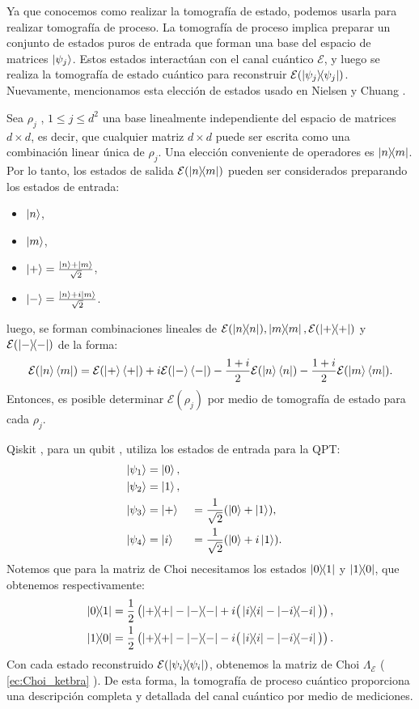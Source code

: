 \documentclass[letterpaper,12pt]{thesisECFM}
\theoremstyle{plain}
\theoremstyle{definition}
\theoremstyle{definition}
\theoremstyle{remark}
\newcommand{\1}{\mathbb{1}}
\begin{document}
Ya que conocemos como realizar la tomografía de estado, podemos usarla para realizar tomografía de proceso. La tomografía de proceso implica preparar un conjunto de estados puros de entrada que forman una base del espacio de matrices $\ket{\psi_j}$. Estos estados interactúan con el canal cuántico $\mathcal{E}$, y luego se realiza la tomografía de estado cuántico para reconstruir $\mathcal{E}(\ketbra{\psi_j}{\psi_j})$. Nuevamente, mencionamos esta elección de estados usado en Nielsen y Chuang \cite{nielsen_chuang_2011}. 

Sea $\rho_j$ , $1\leq j \leq d^2$ una base linealmente independiente del espacio de matrices $d\times d$, es decir, que cualquier matriz $d \times d$ puede ser escrita como una combinación linear única de $\rho_j$.  Una elección conveniente de operadores es $\ketbra{n}{m}$. Por lo tanto, los estados de salida $\mathcal{E}(\ketbra{n}{m})$ pueden ser considerados preparando los estados de entrada:
\begin{itemize}
    \item$\ket{n}$,
    \item$\ket{m}$,
    \item$\ket{+} = \frac{\ket{n} + \ket{m}}{\sqrt{2}}$,
    \item$\ket{-} = \frac{\ket{n} + i\ket{m}}{\sqrt{2}}$.
\end{itemize}
luego, se forman combinaciones lineales de $\mathcal{E} (\ketbra{n}), \ketbra{m},\mathcal{E}(\ketbra{+})$ y $\mathcal{E}(\ketbra{-})$ de la forma:
\begin{equation}
    \mathcal{E}(\ket{n}\bra{m}) = \mathcal{E}(\ket{+}\bra{+}) + i \mathcal{E}(\ket{-}\bra{-}) - \frac{1 + i}{2} \mathcal{E}(\ket{n}\bra{n}) - \frac{1 + i}{2} \mathcal{E}(\ket{m}\bra{m}).
\end{equation}
Entonces, es posible determinar $\mathcal{E}(\rho_j)$ por medio de tomografía de estado para cada $\rho_j$.

Qiskit , para un qubit , utiliza los estados de entrada para la QPT:
\begin{alignat}{2}
    \ket{\psi_1} &= \ket{0}, \\
    \ket{\psi_2} &= \ket{1}, \\
    \ket{\psi_3} &= \ket{+} &&= \frac{1}{\sqrt{2}}(\ket{0} + \ket{1}), \\
    \ket{\psi_4} &= \ket{i} &&= \frac{1}{\sqrt{2}}(\ket{0} + i\ket{1}).
\end{alignat}
Notemos que para la matriz de Choi necesitamos los estados $\ketbra{0}{1}$ y $\ketbra{1}{0}$, que obtenemos respectivamente:
\begin{alignat}{1}
    \ketbra{0}{1} &= \frac{1}{2} \left( \ketbra{+}{+} - \ketbra{-}{-} + i \big( \ketbra{i}{i} - \ketbra{-i}{-i} \big) \right), \\
    \ketbra{1}{0} &= \frac{1}{2} \left( \ketbra{+}{+} - \ketbra{-}{-} - i \big( \ketbra{i}{i} - \ketbra{-i}{-i} \big) \right).
\end{alignat}
Con cada estado reconstruido $\mathcal{E}(\ketbra{\psi_i})$,  obtenemos la matriz de Choi $\Lambda_{\mathcal{E}}$ ( \ref{ec:Choi_ketbra} ). De esta forma, la tomografía de proceso cuántico proporciona una descripción completa y detallada del canal cuántico por medio de mediciones. 
\end{document}

